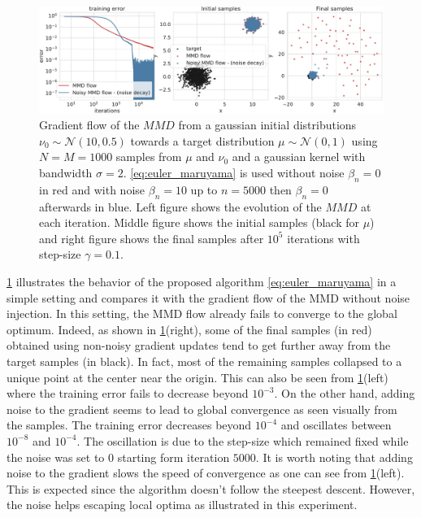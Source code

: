 \begin{figure}[ht]
	\centering
	\includegraphics[width=0.8\linewidth]{figures/Gaussians_error_4}
	\caption{Gradient flow of the $MMD$ from a gaussian initial distributions $\nu_0\sim \mathcal{N}(10,0.5)$  towards a target distribution $\mu\sim \mathcal{N}(0,1)$ using $N=M=1000$ samples from $\mu$ and $\nu_0$ and a gaussian kernel with bandwidth $\sigma = 2 $. \cref{eq:euler_maruyama} is used 
	without noise $\beta_n = 0$ in red and  with noise $\beta_n = 10$ up to $n=5000$ then $\beta_n = 0$ afterwards in blue. 
	Left figure shows the evolution of the $MMD$ at each iteration. Middle figure shows the initial samples (black for $\mu$) and right figure shows the final samples after $10^5$ iterations with step-size $\gamma = 0.1$.}
	\label{fig:experiments}
\end{figure}
\cref{fig:experiments} illustrates the behavior of the proposed algorithm \cref{eq:euler_maruyama} in a simple setting and compares it with the gradient flow of the MMD without noise injection. In this setting, the MMD flow already fails to converge to the global optimum. Indeed, as shown in \cref{fig:experiments}(right), some of the final samples (in red) obtained using non-noisy gradient updates tend to get further away from the target samples (in black). In fact, most of the remaining samples collapsed to a unique point at the center near the origin. This can also be seen from \cref{fig:experiments}(left) where the training error fails to decrease beyond $10^{-3}$. On the other hand, adding noise to the gradient seems to lead to global convergence as seen visually from the samples. The training error decreases beyond $10^{-4}$ and oscillates between $10^{-8}$ and $10^{-4}$. The oscillation is due to the step-size which remained fixed while the noise was set to $0$ starting form iteration $5000$. It is worth noting that adding noise to the gradient slows the speed of convergence as one can see from \cref{fig:experiments}(left). This is expected since the algorithm doesn't follow the steepest descent. However, the noise helps escaping local optima as  illustrated in this experiment.

